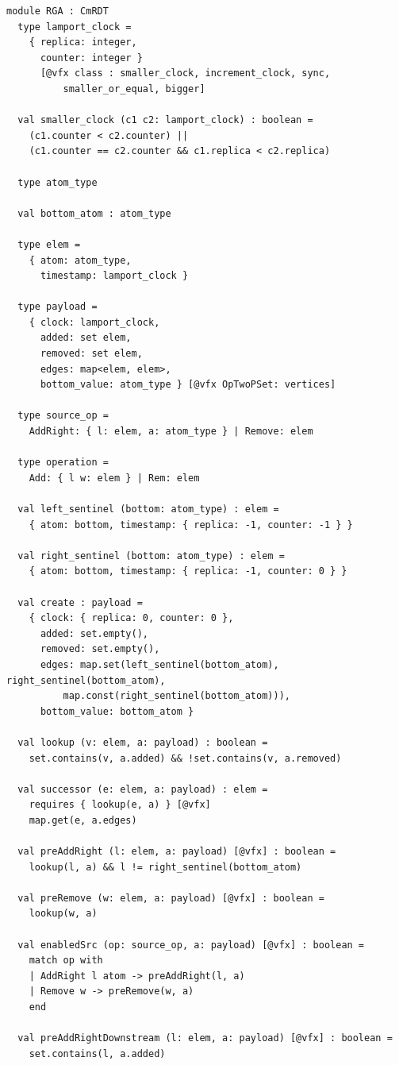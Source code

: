 \begin{lstlisting}[caption={\texttt{RGA}}, label={lst:app_rga}]
module RGA : CmRDT
  type lamport_clock =
    { replica: integer,
      counter: integer }
      [@vfx class : smaller_clock, increment_clock, sync,
          smaller_or_equal, bigger]

  val smaller_clock (c1 c2: lamport_clock) : boolean =
    (c1.counter < c2.counter) ||
    (c1.counter == c2.counter && c1.replica < c2.replica)

  type atom_type

  val bottom_atom : atom_type

  type elem =
    { atom: atom_type,
      timestamp: lamport_clock }

  type payload =
    { clock: lamport_clock,
      added: set elem,
      removed: set elem,
      edges: map<elem, elem>,
      bottom_value: atom_type } [@vfx OpTwoPSet: vertices]

  type source_op =
    AddRight: { l: elem, a: atom_type } | Remove: elem

  type operation =
    Add: { l w: elem } | Rem: elem

  val left_sentinel (bottom: atom_type) : elem =
    { atom: bottom, timestamp: { replica: -1, counter: -1 } }

  val right_sentinel (bottom: atom_type) : elem =
    { atom: bottom, timestamp: { replica: -1, counter: 0 } }

  val create : payload =
    { clock: { replica: 0, counter: 0 },
      added: set.empty(),
      removed: set.empty(),
      edges: map.set(left_sentinel(bottom_atom), right_sentinel(bottom_atom),
          map.const(right_sentinel(bottom_atom))),
      bottom_value: bottom_atom }

  val lookup (v: elem, a: payload) : boolean =
    set.contains(v, a.added) && !set.contains(v, a.removed)

  val successor (e: elem, a: payload) : elem =
    requires { lookup(e, a) } [@vfx]
    map.get(e, a.edges)

  val preAddRight (l: elem, a: payload) [@vfx] : boolean =
    lookup(l, a) && l != right_sentinel(bottom_atom)

  val preRemove (w: elem, a: payload) [@vfx] : boolean =
    lookup(w, a)

  val enabledSrc (op: source_op, a: payload) [@vfx] : boolean =
    match op with
    | AddRight l atom -> preAddRight(l, a)
    | Remove w -> preRemove(w, a)
    end

  val preAddRightDownstream (l: elem, a: payload) [@vfx] : boolean =
    set.contains(l, a.added)


\end{lstlisting}
